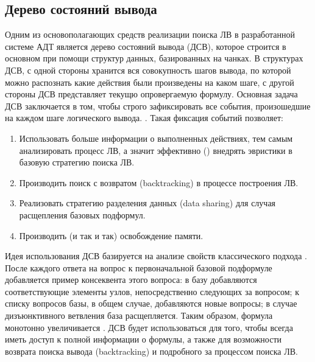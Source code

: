 \subsection{Дерево состояний вывода}
Одним из основополагающих средств реализации поиска ЛВ в разработанной системе АДТ является дерево состояний вывода (ДСВ), которое строится в основном при помощи структур данных, базированных на чанках. В структурах ДСВ, с одной стороны хранится вся совокупность шагов вывода, по которой можно распознать какие действия были произведены на каком шаге, с другой стороны ДСВ представляет текущю опровергаемую формулу. Основная задача ДСВ заключается в том, чтобы строго зафиксировать все события, произошедшие на каждом шаге логического вывода. . Такая фиксация событий позволяет:
\begin{enumerate}
 \item Использовать больше информации о выполненных действиях, тем самым анализировать процесс ЛВ, а значит эффективно () внедрять эвристики в базовую стратегию поиска ЛВ.
 \item Производить поиск с возвратом (backtracking) в процессе построения ЛВ.
 \item Реализовать стратегию разделения данных (data sharing) для случая расщепления базовых подформул.
 \item Производить  (и так и так) освобождение памяти.
\end{enumerate}

Идея использования ДСВ базируется на анализе свойств классического подхода . После каждого ответа на вопрос к первоначальной базовой подформуле добавляется пример консеквента этого вопроса: в базу добавляются соответствующие элементы узлов, непосредственно следующих за вопросом; к списку вопросов базы, в общем случае, добавляются новые вопросы; в случае дизъюнктивного ветвления база расщепляется. 
Таким образом, формула монотонно увеличивается . ДСВ будет использоваться для того, чтобы всегда иметь доступ к полной информации о  формулы, а также для возможности возврата поиска вывода (backtracking) и подробного  за процессом поиска ЛВ.

